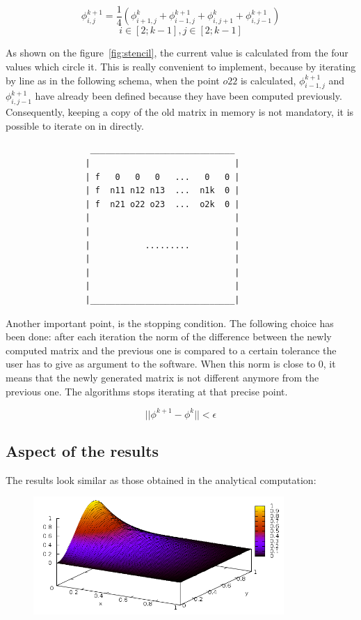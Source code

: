 \documentclass[a4paper,11pt]{article}
\begin{document}
$$\phi^{k+1}_{i,j} = \frac{1}{4}(\phi^{k}_{i+1,j} + \phi^{k+1}_{i-1,j} + \phi^{k}_{i,j+1} + \phi^{k+1}_{i,j-1})$$
$$i \in [2;k-1], j \in [2;k-1]$$

\vspace{1em}

As shown on the figure~\ref{fig:stencil}, the current value is calculated from the four values which circle it.
This is really convenient to implement, because by iterating by line as in the following schema, when
the point $o22$ is calculated, $\phi^{k+1}_{i-1,j}$ and $\phi^{k+1}_{i,j-1}$ have already been defined because they have been
computed previously. Consequently, keeping a copy of the old matrix in memory is not mandatory, it is possible to iterate
on in directly.
  
\begin{verbatim}
                 _____________________________
                |                             |
                | f   0   0   0   ...   0   0 |
                | f  n11 n12 n13  ...  n1k  0 |
                | f  n21 o22 o23  ...  o2k  0 |
                |                             |
                |                             |
                |           .........         |
                |                             |
                |                             |
                |                             |
                |_____________________________|
\end{verbatim}

Another important point, is the stopping condition. The following choice has been done: after each iteration 
the norm of the difference between the newly computed matrix and the previous one is compared to a certain tolerance
the user has to give as argument to the software. When this norm is close to 0, it means that the newly generated matrix is
not different anymore from the previous one. The algorithms stops iterating at that precise point.

\[
  ||\phi^{k+1} - \phi^{k}|| < \epsilon
\]

\subsection{Aspect of the results}

The results look similar as those obtained in the analytical computation:

\begin{figure}[h!]
  \centering
  \includegraphics[width=0.85\textwidth]{images/serial-results.png}
\end{figure}
\end{document}

